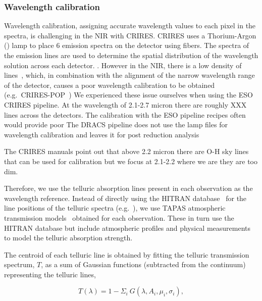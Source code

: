 \subsubsection{Wavelength calibration}
\label{subsec:wavcalib}
Wavelength calibration, assigning accurate wavelength values to each pixel in the spectra, is challenging in the NIR with CRIRES. CRIRES uses a Thorium-Argon (\thar) lamp to place 6 emission spectra on the detector using fibers. The spectra of the \thar emission lines are used to determine the spatial distribution of the wavelength solution across each detector. . However in the NIR, there is a low density of \thar lines~\citep{kerber_laboratory_2009}, which, in combination with the alignment of the narrow wavelength range of the detector, causes a poor wavelength calibration to be obtained (e.g.\ CRIRES-POP~\citep{nicholls_crirespop_2017})
We experienced these issue ourselves when using the ESO CRIRES pipeline. At the wavelength of 2.1-2.7 micron there are roughly XXX \thar lines across the detectors.
The calibration with the ESO pipeline recipes often would provide poor The DRACS pipeline does not use the \thar lamp files for wavelength calibration and leaves it for post reduction analysis

The CRIRES manuals point out that above 2.2 micron there are O-H sky lines that can be used for calibration but we focus at 2.1-2.2 where we are they are too dim.
 
Therefore, we use the telluric absorption lines present in each observation as the wavelength reference. Instead of directly using the HITRAN database~\citep{rothman_hitran2012_2013} for the line positions of the telluric spectra (e.g.~\citep{brogi_signature_2012,brogi_carbon_2014,dekok_detection_2013}), we use TAPAS atmospheric transmission models~\citep{bertaux_tapas_2014} obtained for each observation. These in turn use the HITRAN database but include atmospheric profiles and physical measurements to model the telluric absorption strength.

The centroid of each telluric line is obtained by fitting the telluric transmission spectrum, \(T \), as a sum of Gaussian functions (subtracted from the continuum) representing the telluric lines,

\begin{equation}
T(\lambda) = 1 - {\Sigma}_{i}\ G(\lambda, A_{i}, {\mu}_{i}, {\sigma}_{i}),
\end{equation}

